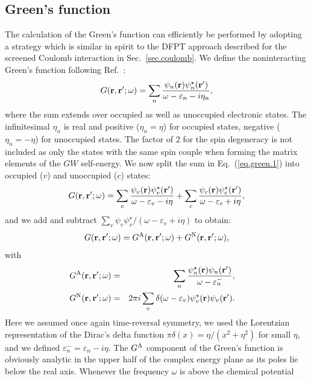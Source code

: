 \documentclass[twocolumn,prb,showpacs,superscriptaddress]{revtex4}
\def\w{\omega}
\def\E{\varepsilon}
\def\r{{\bf r}}
\def\rp{{\bf r^\prime}}
\begin{document}
\subsection{Green's function}\label{sec.green}

The calculation of the Green's function can efficiently be performed 
by adopting a strategy which is similar in spirit to the DFPT approach
described for the screened Coulomb interaction in Sec.\ \ref{sec.coulomb}.
We define the noninteracting Green's function following Ref.\ :
  \begin{equation}\label{eq.green.1}
  G(\r,\rp;\w) = \sum_n \frac{\psi_n(\r)\psi_n^\star(\rp)}{\w-\E_n-i\eta_n},
  \end{equation}
where the sum extends over occupied as well as unoccupied electronic states.
The infinitesimal $\eta_n$ is real and positive ($\eta_n=\eta$) 
for occupied states, negative ($\eta_n=-\eta$) for unoccupied states.\cite{hl,hl86}
The factor of 2 for the spin degeneracy is not included
as only the states with the same spin couple when forming the 
matrix elements of the $GW$ self-energy.\cite{hl86}
We now split the sum in Eq.~(\ref{eq.green.1}) into occupied ($v$) and unoccupied ($c$) states:
  \begin{equation}\label{eq.green.2}
  G(\r,\rp;\w) = \sum_v \frac{\psi_v(\r)\psi_v^\star(\rp)}{\w-\E_v-i\eta}
  + \sum_c \frac{\psi_c(\r)\psi_c^\star(\rp)}{\w-\E_c+i\eta},
  \end{equation}
and we add and subtract $\sum_v \psi_v\psi_v^\star/(\w-\E_v+i\eta)$ to obtain:
  \begin{equation}\label{eq.green.split}
  G(\r,\rp;\w) = G^{\rm A}(\r,\rp;\w) + G^{\rm N}(\r,\rp;\w),
  \end{equation}
with
  \begin{eqnarray}\label{eq.green.split.2}
\!\!\!\!\!\!  G^{\rm A}(\r,\rp;\w) & =&  \sum_n \frac{\psi_n^\star(\r)\psi_n(\rp)}{\w-\E_n^-},  \\ 
\!\!\!\!\!\!  G^{\rm N}(\r,\rp;\w)  & = &  2\pi i \sum_v \delta(\w-\E_v) \psi_v^\star(\r)\psi_v(\rp). \label{eq.green.split.3} 
  \end{eqnarray}
Here we assumed once again time-reversal symmetry, we used the Lorentzian representation of the Dirac's delta function 
$\pi\delta(x)=\eta/(x^2+\eta^2)$ for small $\eta$, and we defined $\E_n^- = \E_n - i\eta$.
The $G^{\rm A}$ component of the Green's function is obviously analytic in the
upper half of the complex energy plane as its poles lie below the real axis.
Whenever the frequency $\w$ is above the chemical potential 
\end{document}
